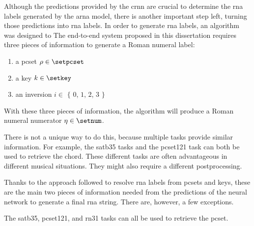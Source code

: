 
Although the predictions provided by the \gls{crnn} are
crucial to determine the \gls{rna} labels generated by the
\gls{arna} model, there is another important step left,
turning those predictions into \gls{rna} labels. In order to generate \gls{rna} labels, an algorithm was designed to  The
end-to-end system proposed in this dissertation requires
three pieces of information to generate a Roman numeral
label:
\begin{enumerate}
    \item a \gls{pcset} $\rho \in \setpcset$
    \item a key $k \in \setkey$
    \item an inversion $i \in$ $\{$ $0$, $1$, $2$, $3$ $\}$
\end{enumerate}

With these three pieces of information, the \algorithmrn{}
algorithm will produce a Roman numeral numerator $\eta \in
\setnum$.

There is not a unique way to do this, because multiple tasks
provide similar information. For example, the \gls{satb35}
tasks and the \gls{pcset121} task can both be used to
retrieve the chord. These different tasks are often
advantageous in different musical situations. They might
also require a different postprocessing.

Thanks to the approach followed to resolve \gls{rna} labels
from \gls{pcset}s and keys, these are the main two pieces of
information needed from the predictions of the neural
network to generate a final \gls{rna} string. There are,
however, a few exceptions.

The \gls{satb35}, \gls{pcset121}, and \gls{rn31} tasks can
all be used to retrieve the \gls{pcset}.




